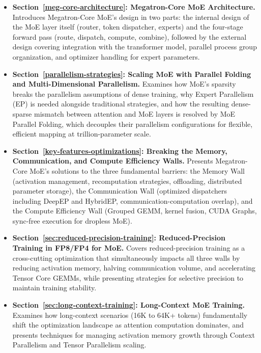 \begin{itemize}

\item \textbf{Section~\ref{meg-core-architecture}: Megatron-Core MoE Architecture.}
Introduces Megatron-Core MoE's design in two parts: the internal design of the MoE layer itself (router, token dispatcher, experts) and the four-stage forward pass (route, dispatch, compute, combine), followed by the external design covering integration with the transformer model, parallel process group organization, and optimizer handling for expert parameters.

\item \textbf{Section~\ref{parallelism-strategies}: Scaling MoE with Parallel Folding and Multi-Dimensional Parallelism.}
Examines how MoE's sparsity breaks the parallelism assumptions of dense training, why Expert Parallelism (EP) is needed alongside traditional strategies, and how the resulting dense-sparse mismatch between attention and MoE layers is resolved by MoE Parallel Folding, which decouples their parallelism configurations for flexible, efficient mapping at trillion-parameter scale.

\item \textbf{Section~\ref{key-features-optimizations}: Breaking the Memory, Communication, and Compute Efficiency Walls.}
Presents Megatron-Core MoE's solutions to the three fundamental barriers: the Memory Wall (activation management, recomputation strategies, offloading, distributed parameter storage), the Communication Wall (optimized dispatchers including DeepEP and HybridEP, communication-computation overlap), and the Compute Efficiency Wall (Grouped GEMM, kernel fusion, CUDA Graphs, sync-free execution for dropless MoE).

\item \textbf{Section~\ref{sec:reduced-precision-training}: Reduced-Precision Training in FP8/FP4 for MoE.}
Covers reduced-precision training as a cross-cutting optimization that simultaneously impacts all three walls by reducing activation memory, halving communication volume, and accelerating Tensor Core GEMMs, while presenting strategies for selective precision to maintain training stability.

\item \textbf{Section~\ref{sec:long-context-training}: Long-Context MoE Training.}
Examines how long-context scenarios (16K to 64K+ tokens) fundamentally shift the optimization landscape as attention computation dominates, and presents techniques for managing activation memory growth through Context Parallelism and Tensor Parallelism scaling.


\end{itemize}
